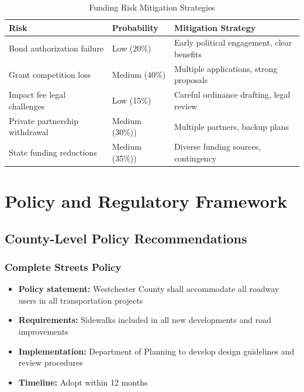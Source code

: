 \documentclass[11pt,letterpaper]{article}
\begin{document}
\begin{table}[h]
\centering
\caption{Funding Risk Mitigation Strategies}
\begin{tabular}{lll}
\toprule
\textbf{Risk} & \textbf{Probability} & \textbf{Mitigation Strategy} \\
\midrule
Bond authorization failure & Low (20\%) & Early political engagement, clear benefits \\
Grant competition loss & Medium (40\%) & Multiple applications, strong proposals \\
Impact fee legal challenges & Low (15\%) & Careful ordinance drafting, legal review \\
Private partnership withdrawal & Medium (30\%)) & Multiple partners, backup plans \\
State funding reductions & Medium (35\%)) & Diverse funding sources, contingency \\
\bottomrule
\end{tabular}
\end{table}

\section{Policy and Regulatory Framework}

\subsection{County-Level Policy Recommendations}

\subsubsection{Complete Streets Policy}
\begin{itemize}
    \item \textbf{Policy statement:} Westchester County shall accommodate all roadway users in all transportation projects
    \item \textbf{Requirements:} Sidewalks included in all new developments and road improvements
    \item \textbf{Implementation:} Department of Planning to develop design guidelines and review procedures
    \item \textbf{Timeline:} Adopt within 12 months
\end{itemize}
\end{document}
